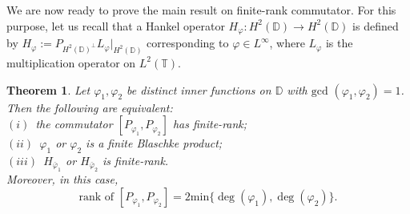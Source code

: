\documentclass[12pt, a4 paper]{amsart}
\newcommand{\D}{\mathbb{D}}
\newcommand{\raro}{\rightarrow}
\theoremstyle{definition}
\theoremstyle{plain}
\newtheorem{thm}{Theorem}[section]
\theoremstyle{definition}
\numberwithin{equation}{section}
\let\phi=\varphi
\begin{document}
We are now ready to prove the main result on finite-rank commutator. For this purpose, let us recall that a Hankel operator $H_\phi: H^2(\D) \raro H^2(\D)$ is defined by $H_{\phi} := P_{H^2(\D)^{\perp}} L_{\phi}|_{H^2(\D)}$ corresponding to $\phi \in L^{\infty}$, where $L_{\phi}$ is the multiplication operator on $L^2(\mathbb{T})$.
\begin{thm}\label{finite-rank}
Let $\phi_1, \phi_2$ be distinct inner functions on $\D$ with ${\mbox{gcd }(\phi_1, \phi_2) = 1}$. Then the following are equivalent:\\ \vspace{1mm}
$(i)$~the commutator $[P_{\phi_1}, P_{\phi_2}]$ has finite-rank;\\ \vspace{1mm}
$(ii)$~$\phi_1$ or $\phi_2$ is a finite Blaschke product;\\
$(iii)$~$H_{\bar \phi_1}$ or $H_{\bar \phi_2}$ is finite-rank.\\ \vspace{1mm} \vspace{1mm}
Moreover, in this case, 
\[
\text{rank of } [P_{\phi_1}, P_{\phi_2}] =2 \text{min}\{\deg (\phi_1), \deg (\phi_2)\}.
\] 
\end{thm}
\end{document}

